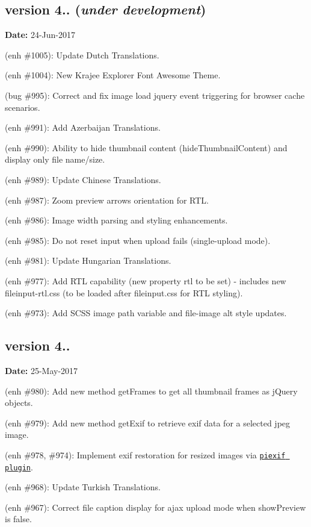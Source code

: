 \subsection*{version 4.. ({\itshape under development})}

{\bfseries Date\+:} 24-\/\+Jun-\/2017


\begin{DoxyItemize}
\item (enh \#1005)\+: Update Dutch Translations.
\item (enh \#1004)\+: New Krajee Explorer Font Awesome Theme.
\item (bug \#995)\+: Correct and fix image load jquery event triggering for browser cache scenarios.
\item (enh \#991)\+: Add Azerbaijan Translations.
\item (enh \#990)\+: Ability to hide thumbnail content ({\ttfamily hide\+Thumbnail\+Content}) and display only file name/size.
\item (enh \#989)\+: Update Chinese Translations.
\item (enh \#987)\+: Zoom preview arrows orientation for R\+TL.
\item (enh \#986)\+: Image width parsing and styling enhancements.
\item (enh \#985)\+: Do not reset input when upload fails (single-\/upload mode).
\item (enh \#981)\+: Update Hungarian Translations.
\item (enh \#977)\+: Add R\+TL capability (new property {\ttfamily rtl} to be set) -\/ includes new {\ttfamily fileinput-\/rtl.\+css} (to be loaded after {\ttfamily fileinput.\+css} for R\+TL styling).
\item (enh \#973)\+: Add S\+C\+SS image path variable and file-\/image alt style updates.
\end{DoxyItemize}

\subsection*{version 4..}

{\bfseries Date\+:} 25-\/\+May-\/2017


\begin{DoxyItemize}
\item (enh \#980)\+: Add new method {\ttfamily get\+Frames} to get all thumbnail frames as j\+Query objects.
\item (enh \#979)\+: Add new method {\ttfamily get\+Exif} to retrieve exif data for a selected jpeg image.
\item (enh \#978, \#974)\+: Implement exif restoration for resized images via \href{https://github.com/hMatoba/piexifjs}{\tt {\ttfamily piexif} plugin}.
\item (enh \#968)\+: Update Turkish Translations.
\item (enh \#967)\+: Correct file caption display for ajax upload mode when {\ttfamily show\+Preview} is {\ttfamily false}.
\end{DoxyItemize}

